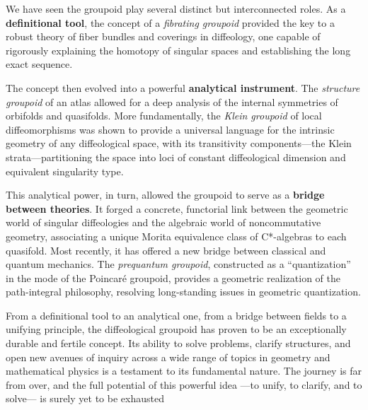 \documentclass[10pt,reqno,letterpaper,twoside]{amsart}
\theoremstyle{article}
\begin{document}
  We have seen the groupoid play several distinct but interconnected roles. As a \textbf{definitional tool}, the concept of a \emph{fibrating groupoid} provided the key to a robust theory of fiber bundles and coverings in diffeology, one capable of rigorously explaining the homotopy of singular spaces and establishing the long exact sequence.
  
  The concept then evolved into a powerful \textbf{analytical instrument}. The \emph{structure groupoid} of an atlas allowed for a deep analysis of the internal symmetries of orbifolds and quasifolds. More fundamentally, the \emph{Klein groupoid} of local diffeomorphisms was shown to provide a universal language for the intrinsic geometry of any diffeological space, with its transitivity components—the Klein strata—partitioning the space into loci of constant diffeological dimension and equivalent singularity type.
  
  This analytical power, in turn, allowed the groupoid to serve as a \textbf{bridge between theories}. It forged a concrete, functorial link between the geometric world of singular diffeologies and the algebraic world of noncommutative geometry, associating a unique Morita equivalence class of C*-algebras to each quasifold. Most recently, it has offered a new bridge between classical and quantum mechanics. The \emph{prequantum groupoid}, constructed as a ``quantization'' in the mode of the Poincaré groupoid, provides a geometric realization of the path-integral philosophy, resolving long-standing issues in geometric quantization.
  
  From a definitional tool to an analytical one,
  from a bridge between fields to a unifying principle,
  the diffeological groupoid has proven to be an exceptionally durable and fertile concept.
  Its ability to solve problems,
  clarify structures,
  and open new avenues of inquiry across a wide range of topics in geometry and mathematical physics is a testament to its fundamental nature.
  The journey is far from over,
  and the full potential of this powerful idea
  ---to unify, to clarify, and to solve---
  is surely yet to be exhausted
  
  
\end{document}
